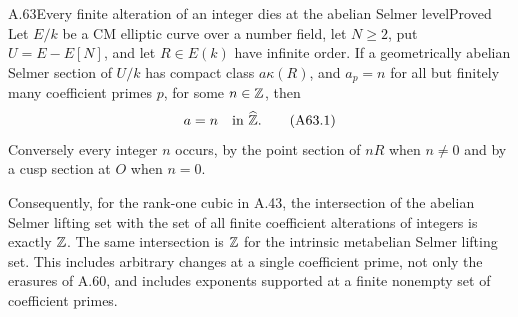 \begin{statement}{A.63}{Every finite alteration of an integer dies at the abelian Selmer level}{Proved}
Let $E/k$ be a CM elliptic curve over a number field, let $N\ge2$,
put $U=E-E[N]$, and let $R\in E(k)$ have infinite order. If a
geometrically abelian Selmer section of $U/k$ has compact class
$a\kappa(R)$, and $a_p=n$ for all but finitely many coefficient
primes $p$, for some $n\in\mathbb Z$, then
\[
 a=n\quad\hbox{in }\widehat{\mathbb Z}.
 \tag{A63.1}
\]
Conversely every integer $n$ occurs, by the point section of
$nR$ when $n\ne0$ and by a cusp section at $O$ when $n=0$.

Consequently, for the rank-one cubic in A.43, the intersection of
the abelian Selmer lifting set with the set of all finite
coefficient alterations of integers is exactly $\mathbb Z$. The same
intersection is $\mathbb Z$ for the intrinsic metabelian Selmer lifting
set. This includes arbitrary changes at a single coefficient
prime, not only the erasures of A.60, and includes exponents
supported at a finite nonempty set of coefficient primes.
\end{statement}

